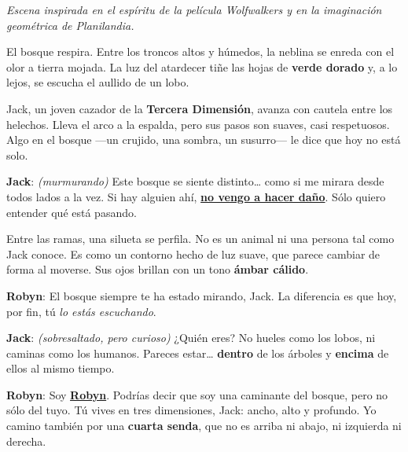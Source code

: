 \documentclass{article}
\begin{document}
\begin{center}
\textcolor{trueblue}{\textit{Escena inspirada en el espíritu de la película \emph{Wolfwalkers} y en la imaginación geométrica de \emph{Planilandia}.}}
\end{center}

\bigskip

El bosque respira. Entre los troncos altos y húmedos, la neblina se enreda con el olor a tierra mojada.  
La luz del atardecer tiñe las hojas de \textcolor{Apple Green}{\textbf{verde dorado}} y, a lo lejos, se escucha el aullido de un lobo.

Jack, un joven cazador de la \textbf{Tercera Dimensión}, avanza con cautela entre los helechos. Lleva el arco a la espalda, pero sus pasos son suaves, casi respetuosos.  
Algo en el bosque —un crujido, una sombra, un susurro— le dice que hoy no está solo.

\medskip

\noindent\textcolor{Cerulean}{\textbf{Jack}}:\quad
\emph{(murmurando)}  
Este bosque se siente distinto… como si me mirara desde todos lados a la vez.  
Si hay alguien ahí, \underline{\textbf{no vengo a hacer daño}}. Sólo quiero entender qué está pasando.

\medskip

Entre las ramas, una silueta se perfila. No es un animal ni una persona tal como Jack conoce.  
Es como un contorno hecho de luz suave, que parece cambiar de forma al moverse. Sus ojos brillan con un tono \textcolor{Cinnabar}{\textbf{ámbar cálido}}.

\medskip

\noindent\textcolor{Cinnabar}{\textbf{Robyn}}:\quad
El bosque siempre te ha estado mirando, Jack.  
La diferencia es que hoy, por fin, tú \emph{lo estás escuchando}.

\medskip

\noindent\textcolor{Cerulean}{\textbf{Jack}}:\quad
\emph{(sobresaltado, pero curioso)}  
¿Quién eres? No hueles como los lobos, ni caminas como los humanos.  
Pareces estar… \textcolor{Lochinvar}{\textbf{dentro}} de los árboles y \textcolor{Lochmara}{\textbf{encima}} de ellos al mismo tiempo.

\medskip

\noindent\textcolor{Cinnabar}{\textbf{Robyn}}:\quad
Soy \underline{\textbf{Robyn}}.  
Podrías decir que soy una caminante del bosque, pero no sólo del tuyo.  
Tú vives en tres dimensiones, Jack: ancho, alto y profundo.  
Yo camino también por una \textcolor{Electric Violet}{\textbf{cuarta senda}}, que no es arriba ni abajo, ni izquierda ni derecha.
\end{document}
